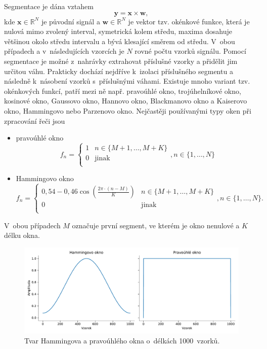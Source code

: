 Segmentace je dána vztahem
\begin{equation}
\label{eqn:Segmentation}
    \mathbf{y} = \mathbf{x} \times \mathbf{w},
\end{equation}
kde $\mathbf{x} \in \mathbb{R}^{N}$ je původní signál a $\mathbf{w} \in \mathbb{R}^{N}$ je vektor tzv. okénkové funkce, která je nulová mimo zvolený interval, symetrická kolem středu, maxima dosahuje většinou okolo středu intervalu a bývá klesající směrem od středu. V~obou případech a v~následujících vzorcích je $N$ rovné počtu vzorků signálu. Pomocí segmentace je možné z~nahrávky extrahovat příslušné vzorky a přidělit jim určitou váhu. Prakticky dochází nejdříve k~izolaci příslušného segmentu a následně k~násobení vzorků s~příslušnými váhami. Existuje mnoho variant tzv. okénkových funkcí, patří mezi ně např. pravoúhlé okno, trojúhelníkové okno, kosinové okno, Gaussovo okno, Hannovo okno, Blackmanovo okno a Kaiserovo okno, Hammingovo nebo Parzenovo okno. Nejčastěji používanými typy oken při zpracování řeči jsou
\begin{itemize}
    \item pravoúhlé okno
    \begin{equation}
    \label{eqn:Rectangular_window}
        f_{n} = \begin{cases}
                   1               & n \in \{M + 1, \dots, M + K\}\\
                   0               & \text{jinak}\\
               \end{cases}, n \in \{ 1, \dots, N\}
    \end{equation}
    
    \item Hammingovo okno
    \begin{equation}
    \label{eqn:Hamming_window}
        f_{n} = \begin{cases}
                   0,54 - 0,46\cos (\frac{2\pi \cdot (n - M)}{K})             & n \in \{M + 1, \dots, M + K\}\\
                   0               & \text{jinak}\\
               \end{cases}, n \in \{ 1, \dots, N\}.
    \end{equation}
   
\end{itemize}
V~obou případech $M$ označuje první segment, ve kterém je okno nenulové a $K$ délku okna. 
\begin{figure}[ht]
  \centering
  \includegraphics[width=\linewidth]{obrazky-figures/hamming_rectangular.pdf}
  \caption{Tvar Hammingova a pravoúhlého okna o~délkách 1000~vzorků.}
  \label{fig:windows}
\end{figure}

